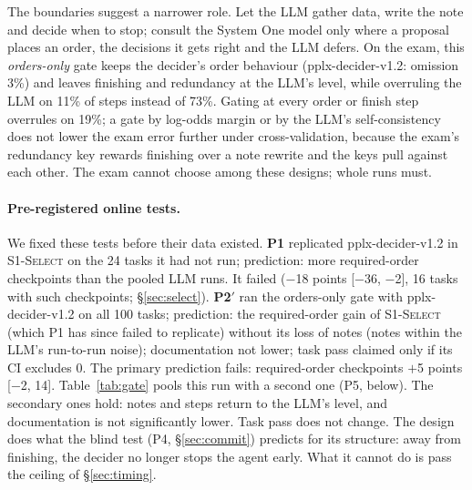 \documentclass[11pt]{article}
\newcommand{\sel}{\textsc{S1-Select}}
\begin{document}
The boundaries suggest a narrower role. Let the LLM gather data, write the note and decide when to stop; consult the
System One model only where a proposal places an order, the decisions it gets right and the LLM defers. On the exam,
this \emph{orders-only} gate keeps the decider's order behaviour (pplx-decider-v1.2: omission 3\%) and leaves finishing
and redundancy at the LLM's level, while overruling the LLM on 11\% of steps instead of 73\%. Gating at every order or
finish step overrules on 19\%; a gate by log-odds margin or by the LLM's self-consistency does not lower the exam
error further under cross-validation, because the exam's redundancy key rewards finishing over a note rewrite and the
keys pull against each other. The exam cannot choose among these designs; whole runs must.

\paragraph{Pre-registered online tests.} We fixed these tests before their data existed.
\textbf{P1} replicated pplx-decider-v1.2 in \sel{} on the 24 tasks it had not run; prediction: more required-order
checkpoints than the pooled LLM runs. It failed ($-$18 points [$-$36, $-$2], 16 tasks with such checkpoints;
\S\ref{sec:select}).
\textbf{P2$'$} ran the orders-only gate with pplx-decider-v1.2 on all 100 tasks; prediction: the required-order gain
of \sel{} (which P1 has since failed to replicate) without its loss of notes (notes within the LLM's run-to-run noise);
documentation not lower; task pass claimed only if its CI excludes 0. The primary prediction fails: required-order
checkpoints $+$5 points [$-$2, 14]. Table~\ref{tab:gate} pools this run with a second one (P5, below). The secondary ones hold: notes and steps
return to the LLM's level, and documentation is not significantly lower. Task pass does not change. The design does
what the blind test (P4, \S\ref{sec:commit}) predicts for its structure: away from finishing, the decider no longer
stops the agent early. What it cannot do is pass the ceiling of \S\ref{sec:timing}.
\end{document}
